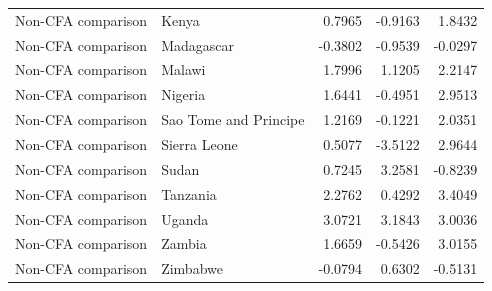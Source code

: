 \begin{table}
\begin{tabular}[t]{llrrr}
Non-CFA comparison & Kenya & 0.7965 & -0.9163 & 1.8432\\
\addlinespace
Non-CFA comparison & Madagascar & -0.3802 & -0.9539 & -0.0297\\
Non-CFA comparison & Malawi & 1.7996 & 1.1205 & 2.2147\\
Non-CFA comparison & Nigeria & 1.6441 & -0.4951 & 2.9513\\
Non-CFA comparison & Sao Tome and Principe & 1.2169 & -0.1221 & 2.0351\\
Non-CFA comparison & Sierra Leone & 0.5077 & -3.5122 & 2.9644\\
\addlinespace
Non-CFA comparison & Sudan & 0.7245 & 3.2581 & -0.8239\\
Non-CFA comparison & Tanzania & 2.2762 & 0.4292 & 3.4049\\
Non-CFA comparison & Uganda & 3.0721 & 3.1843 & 3.0036\\
Non-CFA comparison & Zambia & 1.6659 & -0.5426 & 3.0155\\
Non-CFA comparison & Zimbabwe & -0.0794 & 0.6302 & -0.5131\\
\bottomrule
\end{tabular}
\end{table}